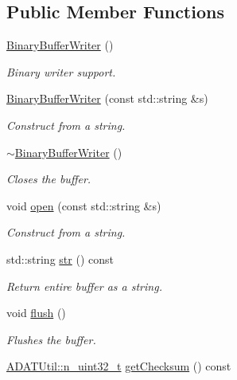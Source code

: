\subsection*{Public Member Functions}
\begin{DoxyCompactItemize}
\item 
\mbox{\hyperlink{classADATIO_1_1BinaryBufferWriter_a3812e6b5808e6349bae019f79d78094a}{Binary\+Buffer\+Writer}} ()
\begin{DoxyCompactList}\small\item\em Binary writer support. \end{DoxyCompactList}\item 
\mbox{\hyperlink{classADATIO_1_1BinaryBufferWriter_acdbd4afbd1fde21aff3ad80d3c67a43c}{Binary\+Buffer\+Writer}} (const std\+::string \&s)
\begin{DoxyCompactList}\small\item\em Construct from a string. \end{DoxyCompactList}\item 
\mbox{\hyperlink{classADATIO_1_1BinaryBufferWriter_a1d17b712ef50e475fe7e4acfe6642547}{$\sim$\+Binary\+Buffer\+Writer}} ()
\begin{DoxyCompactList}\small\item\em Closes the buffer. \end{DoxyCompactList}\item 
void \mbox{\hyperlink{classADATIO_1_1BinaryBufferWriter_a394d7bf949c4def18697af392fb217a5}{open}} (const std\+::string \&s)
\begin{DoxyCompactList}\small\item\em Construct from a string. \end{DoxyCompactList}\item 
std\+::string \mbox{\hyperlink{classADATIO_1_1BinaryBufferWriter_a5c4f9b9c049173452e1cc70fe27ee188}{str}} () const
\begin{DoxyCompactList}\small\item\em Return entire buffer as a string. \end{DoxyCompactList}\item 
void \mbox{\hyperlink{classADATIO_1_1BinaryBufferWriter_accc3319508a804b054d21b6bddeef85d}{flush}} ()
\begin{DoxyCompactList}\small\item\em Flushes the buffer. \end{DoxyCompactList}\item 
\mbox{\hyperlink{namespaceADATUtil_ad945a8afa4db2d1f89b731964adae97e}{A\+D\+A\+T\+Util\+::n\+\_\+uint32\+\_\+t}} \mbox{\hyperlink{classADATIO_1_1BinaryBufferWriter_a3d7ec1583f03981f0a84571646be46f3}{get\+Checksum}} () const

\end{DoxyCompactItemize}
